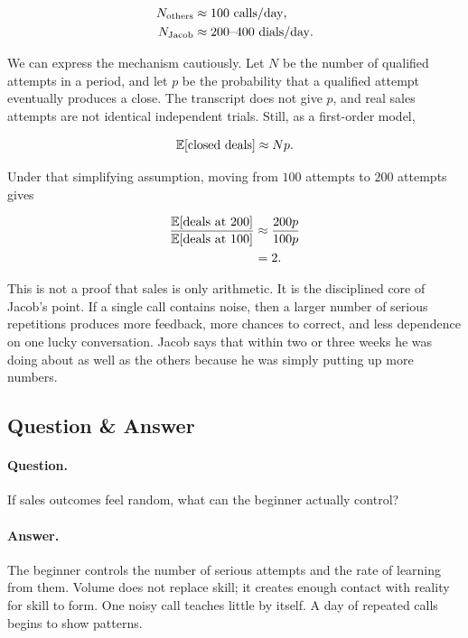 \begin{equation}
\begin{aligned}
N_{\mathrm{others}} &\approx 100\ \mathrm{calls/day}, \\
N_{\mathrm{Jacob}} &\approx 200\hbox{--}400\ \mathrm{dials/day}.
\end{aligned}
\end{equation}

We can express the mechanism cautiously. Let \(N\) be the number of qualified attempts in a period, and let \(p\) be the probability that a qualified attempt eventually produces a close. The transcript does not give \(p\), and real sales attempts are not identical independent trials. Still, as a first-order model,

\begin{equation}
\mathbb{E}[\hbox{closed deals}] \approx Np.
\end{equation}

Under that simplifying assumption, moving from \(100\) attempts to \(200\) attempts gives

\begin{align}
\frac{\mathbb{E}[\hbox{deals at }200]}{\mathbb{E}[\hbox{deals at }100]}
&\approx
\frac{200p}{100p} \\
&= 2.
\end{align}

This is not a proof that sales is only arithmetic. It is the disciplined core of Jacob's point. If a single call contains noise, then a larger number of serious repetitions produces more feedback, more chances to correct, and less dependence on one lucky conversation. Jacob says that within two or three weeks he was doing about as well as the others because he was simply putting up more numbers.

\subsection{Question \& Answer}

\paragraph{Question.}
If sales outcomes feel random, what can the beginner actually control?

\paragraph{Answer.}
The beginner controls the number of serious attempts and the rate of learning from them. Volume does not replace skill; it creates enough contact with reality for skill to form. One noisy call teaches little by itself. A day of repeated calls begins to show patterns.

